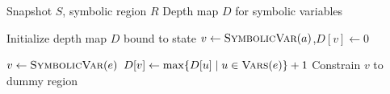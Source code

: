 
\begin{algorithm}[htbp]
\caption{Dereference Depth Tracking}
\label{alg:deref-depth}
\begin{algorithmic}[1]
\Require Snapshot $S$, symbolic region $R$
\Ensure Depth map $D$ for symbolic variables

\State Initialize depth map $D$ bound to state
    \State $v \gets \textsc{SymbolicVar}(a)$,\quad $D[v] \gets 0$
\EndFor

        \State $v \gets \textsc{SymbolicVar}(e)$
        \State $D[v] \gets \max\{ D[u] \mid u \in \textsc{Vars}(e) \} + 1$
        \State Constrain $v$ to dummy region
    \EndIf
\EndWhile
\end{algorithmic}
\end{algorithm}









